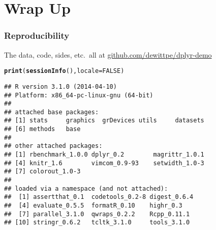 \documentclass{beamer}\usepackage[]{graphicx}\usepackage[]{color}
\makeatletter
\newcommand{\hlnum}[1]{\textcolor[rgb]{0.686,0.059,0.569}{#1}}%
\newcommand{\hlstr}[1]{\textcolor[rgb]{0.192,0.494,0.8}{#1}}%
\newcommand{\hlcom}[1]{\textcolor[rgb]{0.678,0.584,0.686}{\textit{#1}}}%
\newcommand{\hlopt}[1]{\textcolor[rgb]{0,0,0}{#1}}%
\newcommand{\hlstd}[1]{\textcolor[rgb]{0.345,0.345,0.345}{#1}}%
\newcommand{\hlkwc}[1]{\textcolor[rgb]{0.333,0.667,0.333}{#1}}%
\newcommand{\hlkwd}[1]{\textcolor[rgb]{0.737,0.353,0.396}{\textbf{#1}}}%
\newenvironment{kframe}{%
 \def\at@end@of@kframe{}%
 \ifinner\ifhmode%
  \def\at@end@of@kframe{\end{minipage}}%
  \begin{minipage}{\columnwidth}%
 \fi\fi%
 \def\FrameCommand##1{\hskip\@totalleftmargin \hskip-\fboxsep
 \colorbox{shadecolor}{##1}\hskip-\fboxsep
     \hskip-\linewidth \hskip-\@totalleftmargin \hskip\columnwidth}%
 \MakeFramed {\advance\hsize-\width
   \@totalleftmargin\z@ \linewidth\hsize
   \@setminipage}}%
 {\par\unskip\endMakeFramed%
 \at@end@of@kframe}
\newenvironment{knitrout}{}{} %
\makeatother
\begin{document}

\section{Wrap Up}%
\begin{frame}[fragile]
  \frametitle{Reproducibility}
  The data, code, sides, etc.\ all at \url{github.com/dewittpe/dplyr-demo}

\begin{knitrout}\footnotesize
{}\color{fgcolor}\begin{kframe}
\begin{alltt}
\hlkwd{print}\hlstd{(}\hlkwd{sessionInfo}\hlstd{(),} \hlkwc{locale} \hlstd{=} \hlnum{FALSE}\hlstd{)}
\end{alltt}
\begin{verbatim}
## R version 3.1.0 (2014-04-10)
## Platform: x86_64-pc-linux-gnu (64-bit)
## 
## attached base packages:
## [1] stats     graphics  grDevices utils     datasets 
## [6] methods   base     
## 
## other attached packages:
## [1] rbenchmark_1.0.0 dplyr_0.2        magrittr_1.0.1  
## [4] knitr_1.6        vimcom_0.9-93    setwidth_1.0-3  
## [7] colorout_1.0-3  
## 
## loaded via a namespace (and not attached):
##  [1] assertthat_0.1  codetools_0.2-8 digest_0.6.4   
##  [4] evaluate_0.5.5  formatR_0.10    highr_0.3      
##  [7] parallel_3.1.0  qwraps_0.2.2    Rcpp_0.11.1    
## [10] stringr_0.6.2   tcltk_3.1.0     tools_3.1.0
\end{verbatim}
\end{kframe}
\end{knitrout}
\end{frame} 
\end{document}
